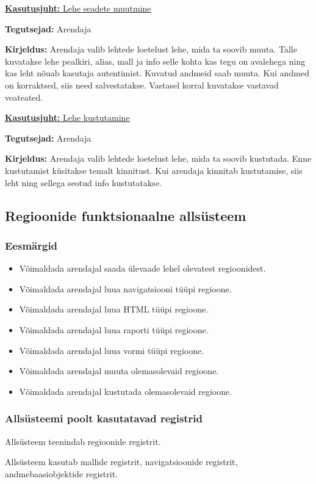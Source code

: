 \documentclass[a4paper,12pt]{article} %
\begin{document}
\underline{\textbf{Kasutusjuht:} Lehe seadete muutmine}
\par
\textbf{Tegutsejad:} Arendaja
\par
\textbf{Kirjeldus:} Arendaja valib lehtede loetelust lehe, mida ta soovib muuta. Talle kuvatakse lehe pealkiri, alias, mall ja info selle kohta kas tegu on avalehega ning kas leht nõuab kasutaja autentimist. Kuvatud andmeid saab muuta. Kui andmed on korraktsed, siis need salvestatakse. Vastasel korral kuvatakse vastavad veateated.
\par

\underline{\textbf{Kasutusjuht:} Lehe kustutamine}
\par
\textbf{Tegutsejad:} Arendaja
\par
\textbf{Kirjeldus:} Arendaja valib lehtede loetelust lehe, mida ta soovib kustutada. Enne kustutamist küsitakse temalt kinnitust. Kui arendaja kinnitab kustutamise, siis leht ning sellega seotud info kustutatakse.
\par

\subsection{Regioonide funktsionaalne allsüsteem}
\subsubsection{Eesmärgid}
\begin{itemize}
\item Võimaldada arendajal saada ülevaade lehel olevatest regioonidest.
\item Võimaldada arendajal luua navigatsiooni tüüpi regioone.
\item Võimaldada arendajal luua HTML tüüpi regioone.
\item Võimaldada arendajal luua raporti tüüpi regioone.
\item Võimaldada arendajal luua vormi tüüpi regioone.
\item Võimaldada arendajal muuta olemasolevaid regioone.
\item Võimaldada arendajal kustutada olemasolevaid regioone.
\end{itemize}
\subsubsection{Allsüsteemi poolt kasutatavad registrid}
Allsüsteem teenindab regioonide registrit.\par
Allsüsteem kasutab mallide registrit, navigatsioonide registrit, andmebaasiobjektide registrit.
\end{document}
